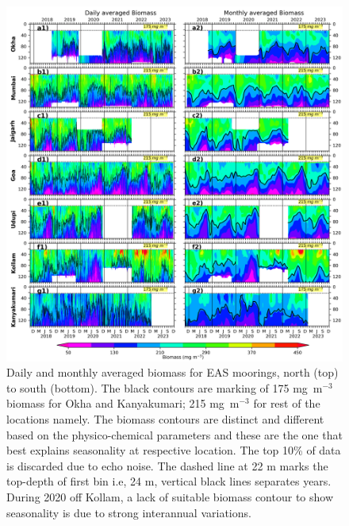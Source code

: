 \documentclass[authoryear,review,12pt]{elsarticle}
\begin{document}
\begin{figure}[htbp]
	\centering
	\includegraphics[width=\textwidth]{./figures/biomass_daily_monthly.png} 
	\captionsetup{justification=justified,font=footnotesize,skip=0.05\baselineskip,width=\textwidth}
	\caption{Daily and monthly averaged biomass for EAS moorings, north (top) to south (bottom). The black contours are marking of 175 mg~m$^{-3}$ biomass for Okha and Kanyakumari; 215 mg~m$^{-3}$  for rest of the locations namely. The biomass contours are distinct and different based on the physico-chemical parameters and these are the one that best explains seasonality at respective location.  The top 10\% of data is discarded due to echo noise. The dashed line at 22 m marks the top-depth of first bin i.e, 24 m, vertical black lines separates years. During 2020 off Kollam, a lack of suitable biomass contour to show seasonality is due to strong interannual variations.}
	\label{fig:dailynmonthly}
\end{figure}
\end{document}
